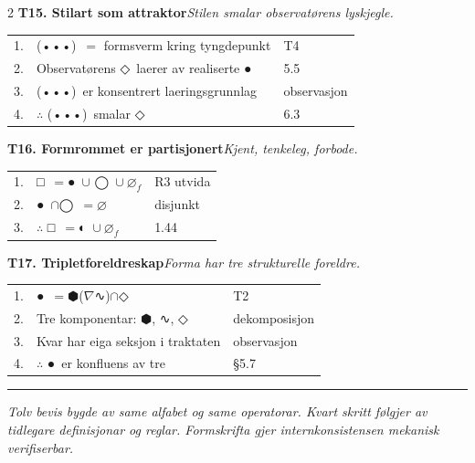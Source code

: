 \documentclass[a4paper,10pt]{article}
\makeatletter
\newcommand{\g}[1]{{\symbolfont #1}}
\newcommand{\gForm}{\g{●}}
\newcommand{\gGrammatikk}{\g{⬢}}
\newcommand{\gFormrom}{\g{□}}
\newcommand{\gLyskjegle}{\g{◇}}
\newcommand{\gPartisjon}{\g{◐}}
\newcommand{\gStilart}{\g{(•••)}}
\newcommand{\gLandskap}{\g{∿}}
\newcommand{\gSirkel}{\g{◯}}
\newcommand{\bv}[3]{%
\vspace{0.4em}%
\noindent\textbf{#1}\hspace{0.4em}\emph{\footnotesize #2}\\[0.15em]
\begin{tabular}{@{}r@{\hspace{0.3em}}l@{\hspace{0.8em}}l@{}}
#3
\end{tabular}%
}
\makeatother
\begin{document}
\begin{multicols}{2}
\bv{T15. Stilart som attraktor}{Stilen smalar observat\o{}rens lyskjegle.}{%
1. & \gStilart\ $=$ formsverm kring tyngdepunkt                                & T4\\
2. & Observat\o{}rens \gLyskjegle\ laerer av realiserte \gForm                 & 5.5\\
3. & \gStilart\ er konsentrert laeringsgrunnlag                                & observasjon\\
4. & $\therefore$ \gStilart\ smalar \gLyskjegle                                & 6.3\\
}

\bv{T16. Formrommet er partisjonert}{Kjent, tenkeleg, forbode.}{%
1. & \gFormrom\ $=$\gForm\ $\cup$ \gSirkel\ $\cup\ \varnothing_f$             & R3 utvida\\
2. & \gForm\ $\cap$\gSirkel\ $=\varnothing$                                   & disjunkt\\
3. & $\therefore$ \gFormrom\ $=$\gPartisjon\ $\cup\ \varnothing_f$             & 1.44\\
}

\bv{T17. Tripletforeldreskap}{Forma har tre strukturelle foreldre.}{%
1. & \gForm\ $=$\gGrammatikk($\nabla$\gLandskap)$\cap$\gLyskjegle               & T2\\
2. & Tre komponentar: \gGrammatikk, \gLandskap, \gLyskjegle                    & dekomposisjon\\
3. & Kvar har eiga seksjon i traktaten                                         & observasjon\\
4. & $\therefore$ \gForm\ er konfluens av tre                                  & \S5.7\\
}

\end{multicols}

\vspace{0.5em}
\begin{center}\rule{\textwidth}{0.4pt}\end{center}
\vspace{0.3em}

\begin{center}
\footnotesize\itshape
Tolv bevis bygde av same alfabet og same operatorar. Kvart skritt f\o{}lgjer av tidlegare definisjonar og reglar. Formskrifta gjer internkonsistensen mekanisk verifiserbar.
\end{center}
\end{document}
